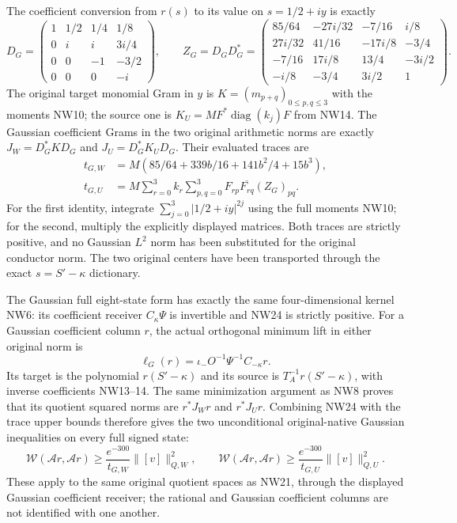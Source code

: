 \documentclass[11pt]{article}
\newcommand{\W}{\mathcal W}
\newcommand{\diag}{\operatorname{diag}}
\begin{document}
The coefficient conversion from $r(s)$ to its value on
$s=1/2+iy$ is exactly
\[
 D_G=\begin{pmatrix}
 1&1/2&1/4&1/8\\0&i&i&3i/4\\0&0&-1&-3/2\\0&0&0&-i
 \end{pmatrix},\qquad
 Z_G=D_GD_G^*=
 \begin{pmatrix}
 85/64&-27i/32&-7/16&i/8\\
 27i/32&41/16&-17i/8&-3/4\\
 -7/16&17i/8&13/4&-3i/2\\
 -i/8&-3/4&3i/2&1
 \end{pmatrix}.
 \tag{NW25}
\]
The original target monomial Gram in $y$ is
$K=(m_{p+q})_{0\le p,q\le3}$ with the moments NW10;
the source one is $K_U=MF^*\diag(k_j)F$ from NW14.
The Gaussian coefficient Grams in the two original
arithmetic norms are exactly $J_W=D_G^*KD_G$ and
$J_U=D_G^*K_UD_G$. Their evaluated traces are
\[
\boxed{\begin{aligned}
 t_{G,W}&=M(85/64+339b/16+141b^2/4+15b^3),\\
 t_{G,U}&=M\sum_{r=0}^3k_r\sum_{p,q=0}^3
                         F_{rp}\overline{F_{rq}}(Z_G)_{pq}.
\end{aligned}}\tag{NW26}
\]
For the first identity, integrate
$\sum_{j=0}^3|1/2+iy|^{2j}$ using the full moments NW10;
for the second, multiply the explicitly displayed matrices.
Both traces are strictly positive, and no Gaussian
$L^2$ norm has been substituted for the original conductor
norm. The two original centers have been transported
through the exact $s=S'-\kappa$ dictionary.

The Gaussian full eight-state form has exactly the same
four-dimensional kernel NW6: its coefficient receiver
$C_\kappa\Psi$ is invertible and NW24 is strictly positive.
For a Gaussian coefficient column $r$, the actual
orthogonal minimum lift in either original norm is
\[
 \ell_G(r)=\iota_-O^{-1}\Psi^{-1}C_{-\kappa}r.
 \tag{NW27}
\]
Its target is the polynomial $r(S'-\kappa)$ and its
source is $T_A^{-1}r(S'-\kappa)$, with inverse coefficients
NW13--14. The same minimization argument as NW8 proves
that its quotient squared norms are $r^*J_Wr$ and
$r^*J_Ur$. Combining NW24 with the trace upper bounds
therefore gives the two unconditional original-native
Gaussian inequalities on every full signed state:
\[
\boxed{\quad
 \W(\mathcal A r,\mathcal A r)
 \ge\frac{e^{-300}}{t_{G,W}}\|[v]\|_{Q,W}^2,
 \qquad
 \W(\mathcal A r,\mathcal A r)
 \ge\frac{e^{-300}}{t_{G,U}}\|[v]\|_{Q,U}^2.
 \quad}\tag{NW28}
\]
These apply to the same original quotient spaces as NW21,
through the displayed Gaussian coefficient receiver; the
rational and Gaussian coefficient columns are not
identified with one another.
\end{document}
